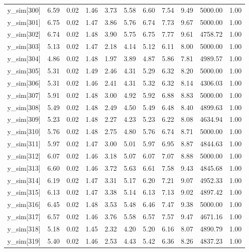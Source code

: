 \begin{table}[ht]
\begin{tabular}{rrrrrrrrrrr}
  y\_sim[300] & 6.59 & 0.02 & 1.46 & 3.73 & 5.58 & 6.60 & 7.54 & 9.49 & 5000.00 & 1.00 \\ 
  y\_sim[301] & 6.75 & 0.02 & 1.47 & 3.86 & 5.76 & 6.74 & 7.73 & 9.67 & 5000.00 & 1.00 \\ 
  y\_sim[302] & 6.74 & 0.02 & 1.48 & 3.90 & 5.75 & 6.75 & 7.77 & 9.61 & 4758.72 & 1.00 \\ 
  y\_sim[303] & 5.13 & 0.02 & 1.47 & 2.18 & 4.14 & 5.12 & 6.11 & 8.00 & 5000.00 & 1.00 \\ 
  y\_sim[304] & 4.86 & 0.02 & 1.48 & 1.97 & 3.89 & 4.87 & 5.86 & 7.81 & 4989.57 & 1.00 \\ 
  y\_sim[305] & 5.31 & 0.02 & 1.49 & 2.46 & 4.31 & 5.29 & 6.32 & 8.20 & 5000.00 & 1.00 \\ 
  y\_sim[306] & 5.31 & 0.02 & 1.46 & 2.41 & 4.31 & 5.32 & 6.32 & 8.14 & 4306.03 & 1.00 \\ 
  y\_sim[307] & 5.91 & 0.02 & 1.48 & 3.00 & 4.92 & 5.92 & 6.88 & 8.83 & 5000.00 & 1.00 \\ 
  y\_sim[308] & 5.49 & 0.02 & 1.48 & 2.49 & 4.50 & 5.49 & 6.48 & 8.40 & 4899.63 & 1.00 \\ 
  y\_sim[309] & 5.23 & 0.02 & 1.48 & 2.27 & 4.23 & 5.23 & 6.22 & 8.08 & 4634.94 & 1.00 \\ 
  y\_sim[310] & 5.76 & 0.02 & 1.48 & 2.75 & 4.80 & 5.76 & 6.74 & 8.71 & 5000.00 & 1.00 \\ 
  y\_sim[311] & 5.97 & 0.02 & 1.47 & 3.00 & 5.01 & 5.97 & 6.95 & 8.87 & 4844.63 & 1.00 \\ 
  y\_sim[312] & 6.07 & 0.02 & 1.46 & 3.18 & 5.07 & 6.07 & 7.07 & 8.88 & 5000.00 & 1.00 \\ 
  y\_sim[313] & 6.60 & 0.02 & 1.46 & 3.72 & 5.63 & 6.61 & 7.58 & 9.43 & 4845.68 & 1.00 \\ 
  y\_sim[314] & 6.19 & 0.02 & 1.47 & 3.31 & 5.17 & 6.20 & 7.21 & 9.07 & 4952.33 & 1.00 \\ 
  y\_sim[315] & 6.13 & 0.02 & 1.47 & 3.38 & 5.14 & 6.13 & 7.13 & 9.02 & 4897.42 & 1.00 \\ 
  y\_sim[316] & 6.45 & 0.02 & 1.48 & 3.53 & 5.48 & 6.46 & 7.47 & 9.38 & 5000.00 & 1.00 \\ 
  y\_sim[317] & 6.57 & 0.02 & 1.46 & 3.76 & 5.58 & 6.57 & 7.57 & 9.47 & 4671.16 & 1.00 \\ 
  y\_sim[318] & 5.18 & 0.02 & 1.45 & 2.32 & 4.20 & 5.20 & 6.16 & 8.07 & 4890.79 & 1.00 \\ 
  y\_sim[319] & 5.40 & 0.02 & 1.46 & 2.53 & 4.43 & 5.42 & 6.36 & 8.26 & 4837.23 & 1.00 \\ 

\end{tabular}
\end{table}
